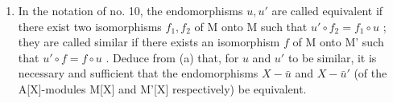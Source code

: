 \begin{enumerate}
\def\labelenumi{(\alph{enumi})}
\setcounter{enumi}{1}
\tightlist
\item
  In the notation of no. 10, the endomorphisms \(u, u'\) are called equivalent if there exist two isomorphisms \(f_1, f_2\) of M onto M such that \(u' \circ f_2 = f_1 \circ u\) ; they are called similar if there exists an isomorphism \(f\) of M onto M' such that \(u' \circ f = f \circ u\) . Deduce from (a) that, for \(u\) and \(u'\) to be similar, it is necessary and sufficient that the endomorphisms \(X - \bar{u}\) and \(X - \bar{u}'\) (of the A{[}X{]}-modules M{[}X{]} and M'{[}X{]} respectively) be equivalent.
\end{enumerate}

